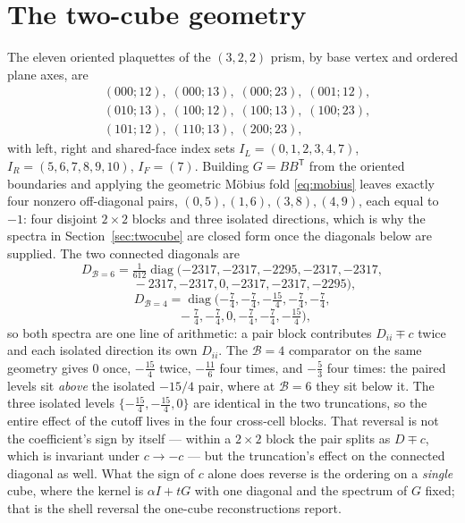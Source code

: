 \documentclass[11pt]{article}
\theoremstyle{plain}
\theoremstyle{definition}
\theoremstyle{remark}
\newcommand{\chk}[1]{}
\begin{document}
\section{The two-cube geometry}\label{app:twocube}

The eleven oriented plaquettes of the $(3,2,2)$ prism, by base vertex and
ordered plane axes, are
\[
\begin{aligned}
&(000;12),\;(000;13),\;(000;23),\;(001;12),\\
&(010;13),\;(100;12),\;(100;13),\;(100;23),\\
&(101;12),\;(110;13),\;(200;23),
\end{aligned}
\]
with left, right and shared-face index sets
$I_L=(0,1,2,3,4,7)$, $I_R=(5,6,7,8,9,10)$, $I_F=(7)$. Building $G=BB^{\mathsf
T}$ from the oriented boundaries and applying the geometric M\"obius fold
\eqref{eq:mobius} leaves exactly four nonzero off-diagonal pairs,
$(0,5),(1,6),(3,8),(4,9)$, each equal to $-1$: four disjoint $2\times2$ blocks
and three isolated directions, which is why the spectra in
Section~\ref{sec:twocube} are closed form once the diagonals below are
supplied. The two connected diagonals are
\[
  D_{\mathcal B=6}=\tfrac1{612}\operatorname{diag}
  (-2317,-2317,-2295,-2317,-2317,
\]
\[
  \qquad -2317,-2317,0,-2317,-2317,-2295),
\]
\[
  D_{\mathcal B=4}=\operatorname{diag}
  (-\tfrac74,-\tfrac74,-\tfrac{15}4,-\tfrac74,-\tfrac74,
\]
\[
  \qquad -\tfrac74,-\tfrac74,0,-\tfrac74,-\tfrac74,-\tfrac{15}4),
\]
so both spectra are one line of arithmetic: a pair block contributes
$D_{ii}\mp c$ twice and each isolated direction its own $D_{ii}$. The $\mathcal B=4$
comparator on the same geometry gives $0$ once, $-\tfrac{15}4$ twice,
$-\tfrac{11}6$ four times, and $-\tfrac53$ four times:
the paired levels sit \emph{above} the isolated $-15/4$ pair, where at $\mathcal B=6$
they sit below it. The three isolated levels $\{-\tfrac{15}4,-\tfrac{15}4,0\}$
are identical in the two truncations, so the entire effect of the cutoff lives
in the four cross-cell blocks. That reversal is not the coefficient's sign by itself --- within a
$2\times2$ block the pair splits as $D\mp c$, which is invariant under
$c\to-c$ --- but the truncation's effect on the connected diagonal as well.
What the sign of $c$ alone does reverse is the ordering on a \emph{single}
cube, where the kernel is $\alpha I+tG$ with one diagonal and the spectrum of
$G$ fixed; that is the shell reversal the one-cube reconstructions report.
\chk{the B=4 comparator on the same geometry gives -1/12 with the reversed spectrum}
\end{document}
